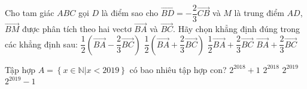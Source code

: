 \documentclass[12pt,a4paper,openany,oneside]{book}
\begin{document}
\begin{ex}%
	Cho tam giác $ABC$ gọi $D$ là điểm sao cho $\overrightarrow{BD}=-\dfrac{2}{3}\overrightarrow{CB}$ và $M$ là trung điểm  $AD$, $\overrightarrow{BM}$ được phân tích theo hai vectơ $\overrightarrow{BA}$ và $\overrightarrow{BC}$. Hãy chọn khẳng định đúng trong các khẳng định sau:
	\choice 
		{$\dfrac{1}{2}\left(\overrightarrow{BA}-\dfrac{2}{3}\overrightarrow{BC}\right)$} 
		 {\True  $\dfrac{1}{2}\left(\overrightarrow{BA}+\dfrac{2}{3}\overrightarrow{BC}\right)$}
		{$\dfrac{1}{2}\overrightarrow{BA}+\dfrac{2}{3}\overrightarrow{BC}$} 
		{$\overrightarrow{BA}+\dfrac{2}{3}\overrightarrow{BC}$}
\end{ex}

\begin{ex}%
	Tập hợp $A=\left\lbrace x\in\mathbb{N}|x<2019\right\rbrace $  có bao nhiêu tập hợp con?
	\choice 
		 {$2^{2018}+1$}
		 {$2^{2018}$}
		 {\True  $2^{2019}$}
		{$2^{2019}-1$}
\end{ex}
\end{document}
